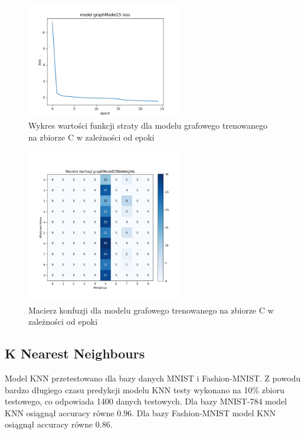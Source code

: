 \documentclass{article}
\begin{document}
\begin{figure}[H]
    \centering
    \includegraphics[width=0.6\textwidth]{../Saves/Graph/graphModel25_loss.png}
    \caption{Wykres wartości funkcji straty dla modelu grafowego trenowanego na zbiorze C w zależności od epoki} 
\end{figure}

\begin{figure}[H]
    \centering
    \includegraphics[width=0.6\textwidth]{../Saves/Graph/graphModel25NoWeights_confusion.png}
    \caption{Macierz konfuzji dla modelu grafowego trenowanego na zbiorze C w zależności od epoki} 
\end{figure}

\subsection{K Nearest Neighbours}
Model KNN przetestowano dla bazy danych MNIST i Fashion-MNIST.
Z powodu bardzo długiego czasu predykcji modelu KNN testy wykonano na 10\% 
zbioru testowego, co odpowiada 1400 danych testowych.
Dla bazy MNIST-784 model KNN osiągnął accuracy równe $0.96$.
Dla bazy Fashion-MNIST model KNN osiągnął accuracy równe $0.86$.
\end{document}

